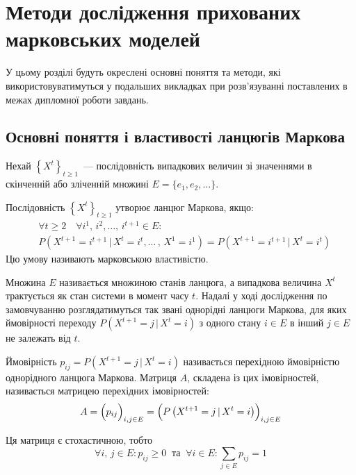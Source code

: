 \chapter{Методи дослідження прихованих марковських моделей}
\label{chap: review}

У цьому розділі будуть окреслені основні поняття та методи, які використовуватимуться у подальших викладках при розв'язуванні поставлених в межах дипломної роботи завдань.

\section{Основні поняття і властивості ланцюгів Маркова}

Нехай $\left\{ X^t \right\}_{t\geqslant 1}$~--- послідовність випадкових величин зі значеннями в скінченній або зліченній множині $E=\{ e_1,e_2,\ldots \}$. 

\begin{definition}\label{def: markovian property}
    Послідовність $\left\{ X^t \right\}_{t\geqslant 1}$ утворює ланцюг Маркова, якщо:
    \begin{align*}
        & \forall t\geqslant 2 \quad \forall i^1,\,i^2,\ldots,\,i^{t+1} \in E: \\
	    & P\left( X^{t+1}=i^{t+1} \, |\, X^t=i^t,\ldots\,,\, X^1=i^1 \right)=P\left( X^{t+1}=i^{t+1} \, |\, X^t=i^t \right)
    \end{align*}
    Цю умову називають марковською властивістю.
\end{definition}

Множина $E$ називається множиною станів ланцюга, а випадкова величина $X^t$ трактується як стан системи в момент часу $t$. Надалі у ході дослідження по замовчуванню розглядатимуться так звані однорідні ланцюги Маркова, для яких ймовірності переходу $P\left( X^{t+1}=j\,|\,X^{t}=i \right)$ з одного стану $i \in E$ в інший $j \in E$ не залежать від $t$.

Ймовірність $p_{ij} = P\left( X^{t+1}=j\,|\,X^{t}=i \right)$ називається перехідною ймовірністю однорідного ланцюга Маркова. Матриця $A$, складена із цих імовірностей, називається матрицею перехідних імовірностей:
\begin{equation*}
    A = \Bigl( p_{ij} \Bigr)_{i,j \in E} = \Bigl( P\left( X^{t+1}=j\,|\,X^{t}=i \right) \Bigr)_{i,j \in E}
\end{equation*} 

Ця матриця є стохастичною, тобто
\begin{equation*}
    \forall i,\,j \in E: p_{ij} \geqslant 0\ \text{ та }\ \forall i \in E: \sum\limits_{j \in E} p_{ij} = 1
\end{equation*}

